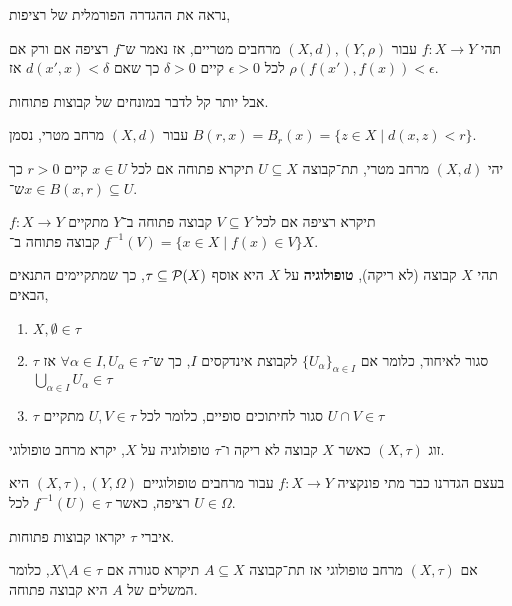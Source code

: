 נראה את ההגדרה הפורמלית של רציפות,
\begin{definition}[רציפות]
	תהי $f : X \to Y$ עבור $(X, d), (Y, \rho)$ מרחבים מטריים, אז נאמר ש־$f$ רציפה אם ורק אם לכל $\epsilon > 0$ קיים $\delta > 0$ כך שאם $d(x', x) < \delta$ אז $\rho(f(x'), f(x)) < \epsilon$.
\end{definition}
אבל יותר קל לדבר במונחים של קבוצות פתוחות.
\begin{definition}[כדור]
	עבור $(X, d)$ מרחב מטרי,
	נסמן $B(r, x) = B_r(x) = \{ z \in X \mid d(x, z) < r \}$.
\end{definition}
\begin{definition}
	יהי $(X, d)$ מרחב מטרי, תת־קבוצה $U \subseteq X$ תיקרא פתוחה אם לכל $x \in U$ קיים $r > 0$ כך ש־$x \in B(x, r) \subseteq U$.
\end{definition}
\begin{definition}
	$f : X \to Y$ תיקרא רציפה אם לכל $V \subseteq Y$ קבוצה פתוחה ב־$Y$ מתקיים $f^{-1}(V) = \{ x \in X \mid f(x) \in V \}$ קבוצה פתוחה ב־$X$.
\end{definition}
\begin{definition}[טופולוגיה]
	תהי $X$ קבוצה (לא ריקה), \textbf{טופולוגיה} על $X$ היא אוסף $\tau \subseteq \mathcal{P}(X)$, כך שמתקיימים התנאים הבאים,
	\begin{enumerate}
		\item $X, \emptyset \in \tau$
		\item $\tau$ סגור לאיחוד, כלומר אם ${\{U_\alpha\}}_{\alpha \in I}$ לקבוצת אינדקסים $I$, כך ש־$\forall \alpha \in I, U_\alpha \in \tau$ אז $\bigcup_{\alpha \in I} U_\alpha \in \tau$
		\item $\tau$ סגור לחיתוכים סופיים, כלומר לכל $U, V \in \tau$ מתקיים $U \cap V \in \tau$
	\end{enumerate}
\end{definition}
\begin{definition}
	זוג $(X, \tau)$ כאשר $X$ קבוצה לא ריקה ו־$\tau$ טופולוגיה על $X$, יקרא מרחב טופולוגי.
\end{definition}
\begin{remark}
	בעצם הגדרנו כבר מתי פונקציה $f : X \to Y$ עבור מרחבים טופולוגיים $(X, \tau), (Y, \Omega)$ היא רציפה, כאשר $f^{-1}(U) \in \tau$ לכל $U \in \Omega$.
\end{remark}
\begin{notation}
	איברי $\tau$ יקראו קבוצות פתוחות.
\end{notation}
\begin{definition}
	אם $(X, \tau)$ מרחב טופולוגי אז תת־קבוצה $A \subseteq X$ תיקרא סגורה אם $X \setminus A \in \tau$, כלומר המשלים של $A$ היא קבוצה פתוחה.
\end{definition}
